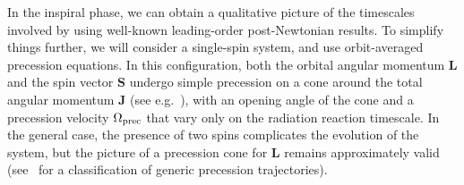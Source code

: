 \documentclass[aps,showpacs,twocolumn,
prd,superscriptaddress,nofootinbib]{revtex4-1}
\begin{document}
In the inspiral phase, we can obtain a qualitative picture of the timescales involved by using well-known leading-order post-Newtonian results. To simplify things further, we will consider a single-spin system, and use orbit-averaged precession equations. In this configuration, both the orbital angular momentum $\bm{L}$ and the spin vector $\bm{S}$ undergo simple precession on a cone around the total angular momentum $\bm{J}$ (see e.g.~\cite{Apostolatos+94, Kidder95}), with an opening angle of the cone and a precession velocity $\Omega_{\rm prec}$ that vary only on the radiation reaction timescale. In the general case, the presence of two spins complicates the evolution of the system, but the picture of a precession cone for $\bm{L}$ remains approximately valid (see~\cite{Kesden+14} for a classification of generic precession trajectories).
\end{document}
